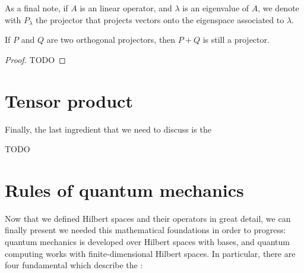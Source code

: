 \documentclass[a4paper, 12pt]{report}
\begin{document}
As a final note, if $A$ is an linear operator, and $\lambda$ is an eigenvalue of $A$, we denote with $P_\lambda$ the projector that projects vectors onto the eigenspace associated to $\lambda$.

\begin{framedprop}[lambda={projector sum}]{}
    If $P$ and $Q$ are two orthogonal projectors, then $P + Q$ is still a projector.
\end{framedprop}

\begin{proof}
    TODO 
\end{proof}

\section{Tensor product}

Finally, the last ingredient that we need to discuss is the 

TODO 

\section{Rules of quantum mechanics}

Now that we defined Hilbert spaces and their operators in great detail, we can finally present we needed this mathematical foundations in order to progress: quantum mechanics is developed over Hilbert spaces with  bases, and quantum computing works with finite-dimensional Hilbert spaces. In particular, there are four fundamental  which describe the :
\end{document}
